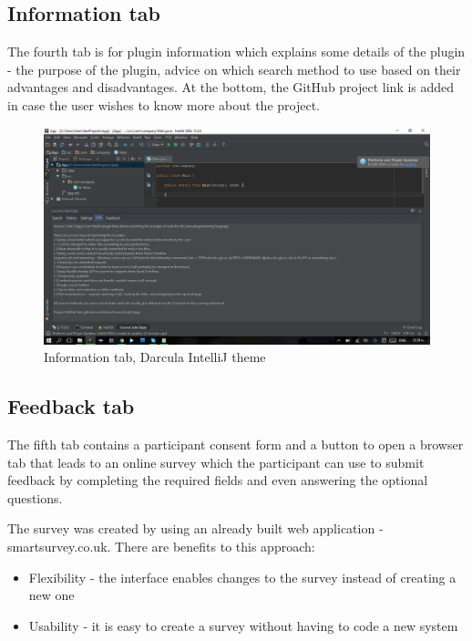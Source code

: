 \documentclass{l4proj}
\begin{document}
\subsection{Information tab}
The fourth tab is for plugin information which explains some details of the plugin - the purpose of the plugin, advice on which search method to use based on their advantages and disadvantages. At the bottom, the GitHub project link is added in case the user wishes to know more about the project.

\begin{figure}[H]
\includegraphics[scale=0.4]{tab-info}
\centering
\caption{Information tab, Darcula IntelliJ theme}
\label{fig:info-tab}
\end{figure}

\subsection{Feedback tab}
The fifth tab contains a participant consent form and a button to open a browser tab that leads to an online survey which the participant can use to submit feedback by completing the required fields and even answering the optional questions. 

The survey was created by using an already built web application -  smartsurvey.co.uk. There are benefits to this approach:
\begin{itemize}
\item Flexibility - the interface enables changes to the survey instead of creating a new one
\item Usability - it is easy to create a survey without having to code a new system
\end{itemize}
\end{document}
